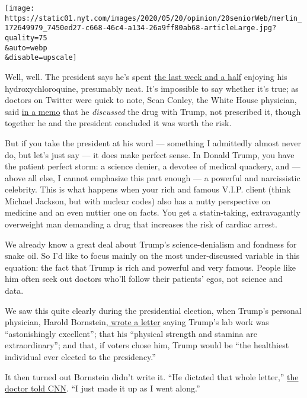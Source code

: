 \texttt{[image: https://static01.nyt.com/images/2020/05/20/opinion/20seniorWeb/merlin\_172649979\_7450ed27-c668-46c4-a134-26a9ff80ab68-articleLarge.jpg?quality=75\\\&auto=webp\\\&disable=upscale]}

Well, well. The president says he's spent
\href{https://www.nytimes.com/2020/05/18/us/politics/trump-hydroxychloroquine-covid-coronavirus.html}{the
last week and a half} enjoying his hydroxychloroquine, presumably neat.
It's impossible to say whether it's true; as doctors on Twitter were
quick to note, Sean Conley, the White House physician, said
\href{https://int.nyt.com/data/documenthelper/6959-letter-from-white-house-physic/e3e29d81b7d6339b9f56/optimized/full.pdf\#page=1}{in
a memo} that he \emph{discussed} the drug with Trump, not prescribed it,
though together he and the president concluded it was worth the risk.

But if you take the president at his word --- something I admittedly
almost never do, but let's just say --- it does make perfect sense. In
Donald Trump, you have the patient perfect storm: a science denier, a
devotee of medical quackery, and --- above all else, I cannot emphasize
this part enough --- a powerful and narcissistic celebrity. This is what
happens when your rich and famous V.I.P. client (think Michael Jackson,
but with nuclear codes) also has a nutty perspective on medicine and an
even nuttier one on facts. You get a statin-taking, extravagantly
overweight man demanding a drug that increases the risk of cardiac
arrest.

We already know a great deal about Trump's science-denialism and
fondness for snake oil. So I'd like to focus mainly on the most
under-discussed variable in this equation: the fact that Trump is rich
and powerful and very famous. People like him often seek out doctors
who'll follow their patients' egos, not science and data.

We saw this quite clearly during the presidential election, when Trump's
personal physician, Harold
Bornstein\href{https://www.npr.org/sections/thetwo-way/2018/05/02/607638733/doctor-trump-dictated-letter-attesting-to-his-extraordinary-health}{,
wrote a letter} saying Trump's lab work was ``astonishingly excellent'';
that his ``physical strength and stamina are extraordinary''; and that,
if voters chose him, Trump would be ``the healthiest individual ever
elected to the presidency.''

It then turned out Bornstein didn't write it. ``He dictated that whole
letter,''
\href{https://www.cnn.com/2018/05/01/politics/harold-bornstein-trump-letter/index.html}{the
doctor told CNN}. ``I just made it up as I went along.''

